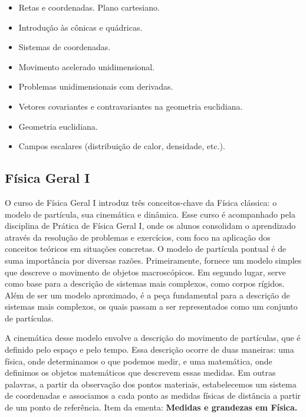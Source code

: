 \documentclass[a4paper, 12pt]{article}
\newcounter{fis}
\newcounter{mat}
\begin{document}
\begin{tcolorbox}[title=Ementa:]
    \begin{itemize}
        \item Retas e coordenadas. Plano cartesiano.
        \item Introdução às cônicas e quádricas.
        \item Sistemas de coordenadas.
        \item Movimento acelerado unidimensional.
        \item Problemas unidimensionais com derivadas.
        \item Vetores covariantes e contravariantes na geometria euclidiana.
        \item Geometria euclidiana.
        \item Campos escalares (distribuição de calor, densidade, etc.).
    \end{itemize}
\end{tcolorbox}

\subsection{Física Geral I}
\label{fis001}

O curso de Física Geral I introduz três conceitos-chave da Física clássica: o modelo de
partícula, sua cinemática e dinâmica. Esse curso é acompanhado pela disciplina de
Prática de Física Geral I, onde os alunos consolidam o aprendizado através da resolução
de problemas e exercícios, com foco na aplicação dos conceitos teóricos em situações
concretas. O modelo de partícula pontual é de suma
importância por diversas razões. Primeiramente, fornece um modelo simples que descreve
o movimento de objetos macroscópicos. Em segundo lugar, serve como base para a
descrição de sistemas mais complexos, como corpos rígidos. Além de ser um modelo
aproximado, é a peça fundamental para a descrição de sistemas mais complexos, os quais
passam a ser representados como um conjunto de partículas.

A cinemática desse modelo envolve a descrição do movimento de partículas, que é
definido pelo espaço e pelo tempo. Essa descrição ocorre de duas maneiras: uma física,
onde determinamos o que podemos medir, e uma matemática, onde definimos os objetos
matemáticos que descrevem essas medidas. Em outras palavras, a partir da observação dos
pontos materiais, estabelecemos um sistema de coordenadas e associamos a cada ponto as
medidas físicas de distância a partir de um ponto de referência. Item da ementa: {\bf
Medidas e grandezas em Física.}
\end{document}
